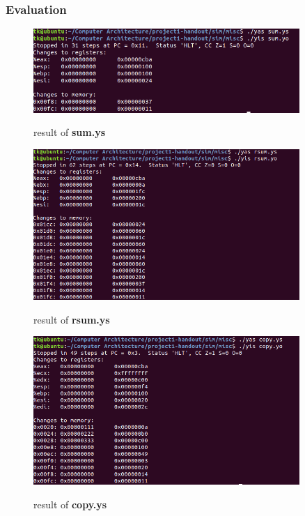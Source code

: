 \documentclass{article}
\begin{document}
\subsubsection{Evaluation}
\begin{figure}[H]
	\begin{minipage}[h]{\textwidth}
		\centering
		\includegraphics[width=0.9\textwidth]{sum_result.png}
		\caption{result of \textbf{sum.ys}} \label{Fig-G1}
		\hspace{5mm}
		\includegraphics[width=0.9\textwidth]{rsum_result.png}
		\caption{result of \textbf{rsum.ys}} \label{Fig-G2}
		\hspace{5mm}
		\includegraphics[width=0.9\textwidth]{copy_result.png}
		\caption{result of \textbf{copy.ys}} \label{Fig-G3}
	\end{minipage}
\end{figure}
\end{document}
